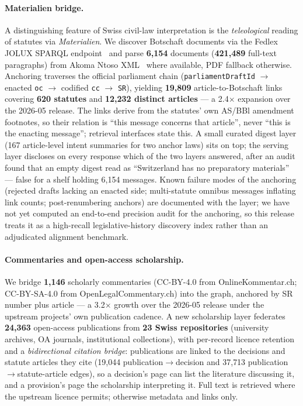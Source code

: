 \documentclass[11pt,a4paper]{article}
\begin{document}
\paragraph{Materialien bridge.} A distinguishing feature of Swiss civil-law interpretation is the \emph{teleological} reading of statutes via \emph{Materialien}. We discover Botschaft documents via the Fedlex JOLUX SPARQL endpoint~\citep{fedlexjolux} and parse \textbf{6{,}154} documents (\textbf{421{,}489} full-text paragraphs) from Akoma Ntoso XML~\citep{akomantoso} where available, PDF fallback otherwise. Anchoring traverses the official parliament chain (\texttt{parliamentDraftId} $\to$ enacted \texttt{oc} $\to$ codified \texttt{cc} $\to$ \texttt{SR}), yielding \textbf{19{,}809} article-to-Botschaft links covering \textbf{620 statutes} and \textbf{12{,}232 distinct articles} --- a 2.4$\times$ expansion over the 2026-05 release. The links derive from the statutes' own AS/BBl amendment footnotes, so their relation is ``this message concerns that article'', never ``this is the enacting message''; retrieval interfaces state this. A small curated digest layer (167 article-level intent summaries for two anchor laws) sits on top; the serving layer discloses on every response which of the two layers answered, after an audit found that an empty digest read as ``Switzerland has no preparatory materials'' --- false for a shelf holding 6{,}154 messages. Known failure modes of the anchoring (rejected drafts lacking an enacted side; multi-statute omnibus messages inflating link counts; post-renumbering anchors) are documented with the layer; we have not yet computed an end-to-end precision audit for the anchoring, so this release treats it as a high-recall legislative-history discovery index rather than an adjudicated alignment benchmark.

\paragraph{Commentaries and open-access scholarship.} We bridge \textbf{1{,}146} scholarly commentaries (CC-BY-4.0 from OnlineKommentar.ch; CC-BY-SA-4.0 from OpenLegalCommentary.ch) into the graph, anchored by SR number plus article --- a 3.2$\times$ growth over the 2026-05 release under the upstream projects' own publication cadence. A new scholarship layer federates \textbf{24{,}363} open-access publications from \textbf{23 Swiss repositories} (university archives, OA journals, institutional collections), with per-record licence retention and a \emph{bidirectional citation bridge}: publications are linked to the decisions and statute articles they cite (19{,}044 publication$\to$decision and 37{,}713 publication$\to$statute-article edges), so a decision's page can list the literature discussing it, and a provision's page the scholarship interpreting it. Full text is retrieved where the upstream licence permits; otherwise metadata and links only.
\end{document}
